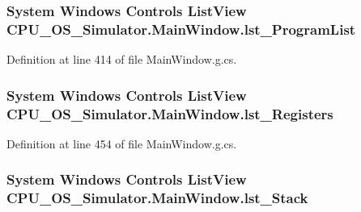 \subsubsection[{lst\+\_\+\+Program\+List}]{\setlength{\rightskip}{0pt plus 5cm}System Windows Controls List\+View C\+P\+U\+\_\+\+O\+S\+\_\+\+Simulator.\+Main\+Window.\+lst\+\_\+\+Program\+List\hspace{0.3cm}{\ttfamily [package]}}\label{class_c_p_u___o_s___simulator_1_1_main_window_ab33f21e0f19eab104e6f67f44d89daeb}


Definition at line 414 of file Main\+Window.\+g.\+cs.

\hypertarget{class_c_p_u___o_s___simulator_1_1_main_window_ae88013c536662328670f206a4cab99b1}{}
\subsubsection[{lst\+\_\+\+Registers}]{\setlength{\rightskip}{0pt plus 5cm}System Windows Controls List\+View C\+P\+U\+\_\+\+O\+S\+\_\+\+Simulator.\+Main\+Window.\+lst\+\_\+\+Registers\hspace{0.3cm}{\ttfamily [package]}}\label{class_c_p_u___o_s___simulator_1_1_main_window_ae88013c536662328670f206a4cab99b1}


Definition at line 454 of file Main\+Window.\+g.\+cs.

\hypertarget{class_c_p_u___o_s___simulator_1_1_main_window_a8453db331c7cc1e7c1e711a06b2ec30c}{}
\subsubsection[{lst\+\_\+\+Stack}]{\setlength{\rightskip}{0pt plus 5cm}System Windows Controls List\+View C\+P\+U\+\_\+\+O\+S\+\_\+\+Simulator.\+Main\+Window.\+lst\+\_\+\+Stack\hspace{0.3cm}{\ttfamily [package]}}\label{class_c_p_u___o_s___simulator_1_1_main_window_a8453db331c7cc1e7c1e711a06b2ec30c}


